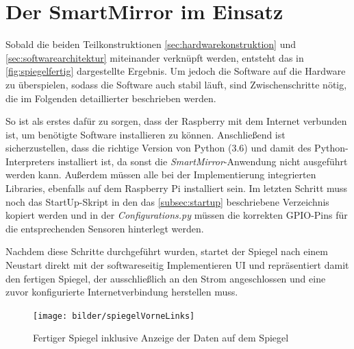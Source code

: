 \section{Der SmartMirror im Einsatz}

Sobald die beiden Teilkonstruktionen \autoref{sec:hardwarekonstruktion} und \autoref{sec:softwarearchitektur} miteinander verknüpft werden, entsteht das in \autoref{fig:spiegelfertig} dargestellte Ergebnis.
Um jedoch die Software auf die Hardware zu überspielen, sodass die Software auch stabil läuft, sind Zwischenschritte nötig, die im Folgenden detaillierter beschrieben werden.

So ist als erstes dafür zu sorgen, dass der Raspberry mit dem Internet verbunden ist, um benötigte Software installieren zu können. Anschließend ist sicherzustellen, dass die richtige Version von Python (3.6) und damit des Python-Interpreters installiert ist, da sonst die \textit{SmartMirror}-Anwendung nicht ausgeführt werden kann. 
Außerdem müssen alle bei der Implementierung integrierten Libraries, ebenfalls auf dem Raspberry Pi installiert sein. 
Im letzten Schritt muss noch das StartUp-Skript in den das \autoref{subsec:startup} beschriebene Verzeichnis kopiert werden und in der \textit{Configurations.py} müssen die korrekten GPIO-Pins für die entsprechenden Sensoren hinterlegt werden. 

Nachdem diese Schritte durchgeführt wurden, startet der Spiegel nach einem Neustart direkt mit der softwareseitig Implementieren UI und repräsentiert damit den fertigen Spiegel, der ausschließlich an den Strom angeschlossen und eine zuvor konfigurierte Internetverbindung herstellen muss. 

\begin{figure}
	\centering
	\texttt{[image: bilder/spiegelVorneLinks]}
	\caption[Fertiger Spiegel inklusive Anzeige der Daten]{Fertiger Spiegel inklusive Anzeige der Daten auf dem Spiegel}
	\label{fig:spiegelfertig}
\end{figure}
